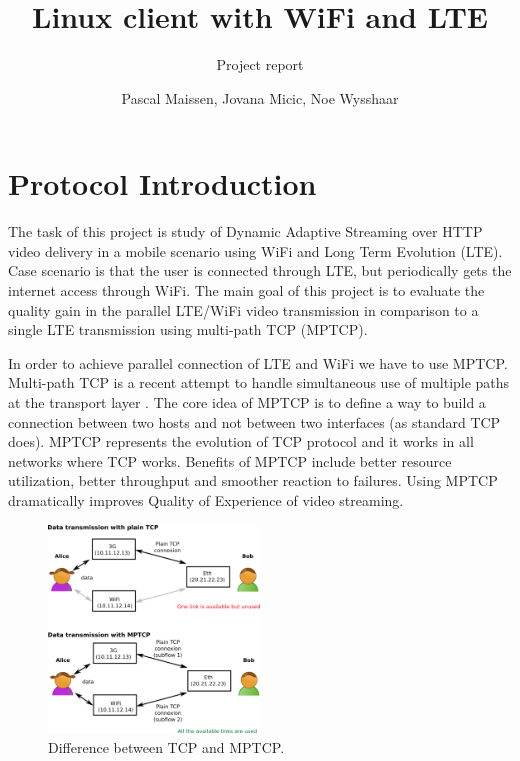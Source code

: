 \documentclass{llncs}
\begin{document}
\title{Linux client with WiFi and LTE}
\subtitle{Project report}
\author{Pascal Maissen, Jovana Micic, Noe Wysshaar} 
\maketitle

\section{Protocol Introduction}
The task of this project is study of Dynamic Adaptive Streaming over HTTP video delivery in a mobile scenario using WiFi and Long Term Evolution (LTE). Case scenario is that the user is connected through LTE, but periodically gets the internet access through WiFi. The main goal of this project is to evaluate the quality gain in the parallel LTE/WiFi video transmission in comparison to a single LTE transmission using multi-path TCP (MPTCP).

In order to achieve parallel connection of LTE and WiFi we have to use MPTCP. Multi-path TCP is a  recent attempt  to handle simultaneous use of multiple paths at the transport layer \cite{MPTCP}. The core idea of MPTCP is to define a way to build a connection between two hosts and not between two interfaces (as standard TCP does). MPTCP represents the evolution of TCP protocol and it works in all networks where TCP works.  Benefits of MPTCP include better resource utilization, better throughput and smoother reaction to failures. Using MPTCP dramatically improves Quality of Experience of video streaming. 

\begin{figure}[H]
\centering
\includegraphics[width=0.5\textwidth]{mptcp.png}
\caption{\label{fig:mptcp} Difference between TCP and MPTCP.}
\end{figure}
\end{document}
